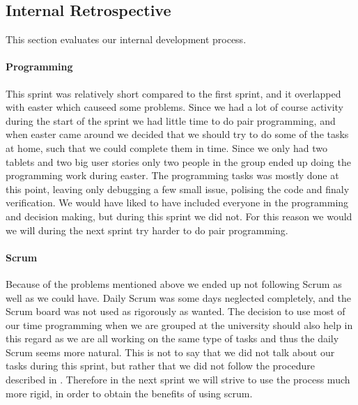 \subsection{Internal Retrospective}\label{internal2}
This section evaluates our internal development process.
\paragraph{Programming}
This sprint was relatively short compared to the first sprint, and it overlapped with easter which causeed some problems. 
Since we had a lot of course activity during the start of the sprint we had little time to do pair programming, and when easter came around we decided that we should try to do some of the tasks at home, such that we could complete them in time. 
Since we only had two tablets and two big user stories only two people in the group ended up doing the programming work during easter.
The programming tasks was mostly done at this point, leaving only debugging a few small issue, polising the code and finaly verification. 
We would have liked to have included everyone in the programming and decision making, but during this sprint we did not. 
For this reason we would we will during the next sprint try harder to do pair programming. 

\paragraph{Scrum}
Because of the problems mentioned above we ended up not following Scrum as well as we could have.
Daily Scrum was some days neglected completely, and the Scrum board was not used as rigorously as wanted.
The decision to use most of our time programming when we are grouped at the university should also help in this regard as we are all working on the same type of tasks and thus the daily Scrum seems more natural.
This is not to say that we did not talk about our tasks during this sprint, but rather that we did not follow the procedure described in .
Therefore in the next sprint we will strive to use the process much more rigid, in order to obtain the benefits of using scrum.
